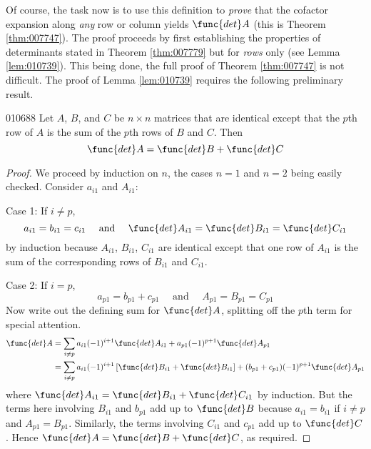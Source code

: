 Of course, the task now is to use this definition to \textit{prove} that the cofactor expansion along \textit{any} row or column yields $\func{det }A$ (this is Theorem \ref{thm:007747}). The proof proceeds by first establishing the properties of determinants stated in Theorem \ref{thm:007779} but for \textit{rows} only (see Lemma \ref{lem:010739}). This being done, the full proof of Theorem \ref{thm:007747} is not difficult. The proof of Lemma \ref{lem:010739} requires the following preliminary result.


\begin{lemma}{}{010688}
Let $A$, $B$, and $C$ be $n \times n$ matrices that are identical except that the $p$th row of $A$ is the sum of the $p$th rows of $B$ and $C$. Then
\begin{equation*}
\func{det } A = \func{det } B + \func{det } C
\end{equation*}
\end{lemma}

\begin{proof}
We proceed by induction on $n$, the cases $n = 1$ and $n = 2$ being easily checked. Consider $a_{i1}$ and $A_{i1}$:


Case 1: If $i \neq p$,
\begin{equation*}
a_{i1} = b_{i1} = c_{i1} \quad \mbox{ and } \quad \func{det } A_{i1} = \func{det } B_{i1} = \func{det } C_{i1}
\end{equation*}
by induction because $A_{i1}$, $B_{i1}$, $C_{i1}$ are identical except that one row of $A_{i1}$ is the sum of the corresponding rows of $B_{i1}$ and $C_{i1}$.


Case 2: If $i = p$,
\begin{equation*}
a_{p1} = b_{p1} + c_{p1} \quad \mbox{ and } \quad A_{p1} = B_{p1} = C_{p1} 
\end{equation*}
Now write out the defining sum for $\func{det }A$, splitting off the $p$th term for special attention.
\begin{align*}
\func{det } A &= \sum_{i \neq p} a_{i1} (-1)^{i+1} \func{det } A_{i1} + a_{p1} (-1)^{p+1} \func{det } A_{p1} \\
&= \sum_{i \neq p} a_{i1} (-1)^{i+1} \left[ \func{det } B_{i1} + \func{det } B_{i1} \right] + (b_{p1} + c_{p1}) (-1)^{p+1} \func{det } A_{p1}
\end{align*}
where $\func{det }A_{i1} = \func{det }B_{i1} + \func{det }C_{i1}$ by induction. But the terms here involving $B_{i1}$ and $b_{p1}$ add up to $\func{det }B$ because $a_{i1} = b_{i1}$ if $i \neq p$ and $A_{p1} = B_{p1}$. Similarly, the terms involving $C_{i1}$ and $c_{p1}$ add up to $\func{det }C$. Hence $\func{det }A = \func{det }B + \func{det }C$, as required.
\end{proof}

